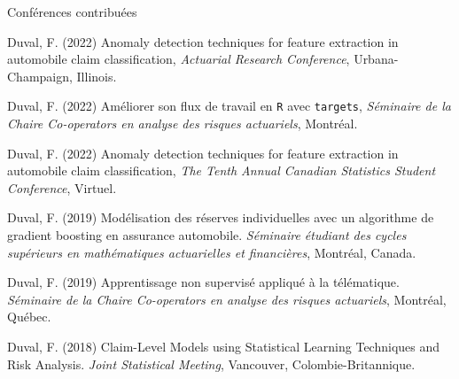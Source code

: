 \begin{cventries}
  \cventry
    {} %
    {Conférences contribuées} %
    {} %
    {} %
    {
      \begin{cvitems} %
        \item {Duval, F. (2022) Anomaly detection techniques for feature extraction in automobile claim classification, \textit{Actuarial Research Conference}, Urbana-Champaign, Illinois.}
        \item {Duval, F. (2022) Améliorer son flux de travail en \texttt{R} avec \texttt{targets}, \textit{Séminaire de la Chaire Co-operators en analyse des risques actuariels}, Montréal.}
        \item {Duval, F. (2022) Anomaly detection techniques for feature extraction in automobile claim classification, \textit{The Tenth Annual Canadian Statistics Student Conference}, Virtuel.}
      	\item {Duval, F. (2019) Modélisation des réserves individuelles avec un algorithme de gradient boosting en assurance automobile. \textit{Séminaire étudiant des cycles supérieurs en mathématiques actuarielles et financières}, Montréal, Canada.}
      	\item {Duval, F. (2019) Apprentissage non supervisé appliqué à la télématique. \textit{Séminaire de la Chaire Co-operators en analyse des risques actuariels}, Montréal, Québec.}
      	\item {Duval, F. (2018) Claim-Level Models using Statistical Learning Techniques and Risk Analysis. \textit{Joint Statistical Meeting}, Vancouver, Colombie-Britannique.}
      \end{cvitems}
    }
\end{cventries}